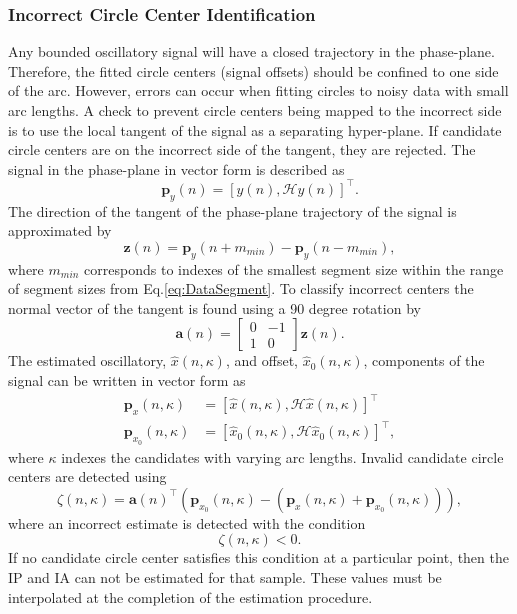 \documentclass[journal,11pt,a4paper,onecolumn,draftcls]{IEEEtran}
\begin{document}
\subsubsection{Incorrect Circle Center Identification}
Any bounded oscillatory signal will have a closed trajectory in the phase-plane. Therefore, the fitted circle centers (signal offsets) should be confined to one side of the arc. However, errors can occur when fitting circles to noisy data with small arc lengths. A check to prevent circle centers being mapped to the incorrect side is to use the local tangent of the signal as a separating hyper-plane. If candidate circle centers are on the incorrect side of the tangent, they are rejected. The signal in the phase-plane in vector form is described as
\begin{equation}
	\mathbf{p}_y(n) = \left[y\left(n\right),\mathcal{H}y\left(n\right)\right]^{\top}.
\end{equation}
The direction of the tangent of the phase-plane trajectory of the signal is approximated by 
\begin{equation}
	\mathbf{z}(n) = \mathbf{p}_y(n + m_{min}) - \mathbf{p}_y(n - m_{min}),
\end{equation}
where $m_{min}$ corresponds to indexes of the smallest segment size within the range of segment sizes from Eq.\ref{eq:DataSegment}. To classify incorrect centers the normal vector of the tangent is found using a 90 degree rotation by
\begin{equation}
	\mathbf{a}\left(n\right) = \left[\begin{array}{cc}
	0 & -1 \\
	1 & 0\end{array}\right]\mathbf{z}(n).
\end{equation}
The estimated oscillatory, $\hat{x}(n,\kappa)$, and offset, $\hat{x}_0(n,\kappa)$, components of the signal can be written in vector form as
\begin{align}
	\mathbf{p}_x(n,\kappa) &= \left[\hat{x}\left(n,\kappa\right),\mathcal{H}\hat{x}\left(n,\kappa\right)\right]^{\top} \\ 
	\mathbf{p}_{x_0}\left(n,\kappa\right) &= \left[\hat{x}_0\left(n,\kappa\right), \mathcal{H}\hat{x}_0\left(n,\kappa\right)\right]^{\top}, 
\end{align}
where $\kappa$ indexes the candidates with varying arc lengths. Invalid candidate circle centers are detected using 
\begin{equation}
    \zeta(n,\kappa) = \mathbf{a}\left( n\right)^{\top}\left( \mathbf{p}_{x_0}\left( n,\kappa \right) - \left(\mathbf{p}_x\left( n,\kappa \right) + \mathbf{p}_{x_0}\left( n,\kappa \right)\right) \right),
\end{equation}
where an incorrect estimate is detected with the condition
\begin{equation}\label{eq:IncorrectSideClassifier}
    \zeta(n,\kappa) < 0.
\end{equation} 
If no candidate circle center satisfies this condition at a particular point, then the IP and IA can not be estimated for that sample. These values must be interpolated at the completion of the estimation procedure. 
\end{document}
